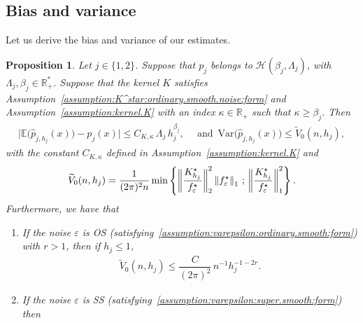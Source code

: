 \documentclass[11pt,a4paper,openany]{article}
\newtheorem{proposition}[thm]{Proposition}
\newcommand{\Var}{\mbox{Var}}
\def\R{\mathbb{R}}
\def\r{{r}}
\begin{document}
\subsection{Bias and variance}
Let us derive the bias and variance of our estimates. 
\begin{proposition}\label{lem:point-wise:mean-var.p1-p2}
	Let $j\in\{1,2\}$. Suppose that $p_{j}$ belongs to  $\mathcal{H}(\beta_{j}, \Lambda_{j})$, with $\Lambda_{j},\beta_{j} \in \R^{*}_{+}$. Suppose that the kernel $K$ satisfies Assumption~\ref{assumption:K^star:ordinary.smooth.noise:form} and  Assumption~\ref{assumption:kernel.K} with an index $\mathcal{\kappa} \in \mathbb{R}_{+}$ such that $\mathcal{\kappa} \geq   \beta_{j}$.  Then 	\begin{align*}
		\Big| \mathbb{E}\big(\widehat{p}_{j , h_{j} }(x)\big) - p_{j}(x) \Big|  
		\leq     C_{K,\mathcal{\kappa}} \,  \Lambda_{j} \,  h_{j}^{\beta_{j}} , 
		\,  &\textrm{ and }  \,
		\Var\big( \widehat{p}_{j , h_{j} }(x) \big)  \leq  
		\widetilde V_{0}(n,h_{j}),
	\end{align*}
	with 	the constant  $C_{K,\mathcal{\kappa}}$ defined in Assumption~\ref{assumption:kernel.K} and 
	\begin{align*}
	\widetilde V_{0}(n,h_{j}) = \frac{1}{(2\pi)^{2} n} \min  \left\{ \left\|  \dfrac{ \hspace{0.01cm}  K_{h_{j}}^{\star} \hspace{0.01cm}   }{f_{\varepsilon}^{\star}}    \right\|_{2}^{2}  \left\| f_{\varepsilon}^{\star} \right\|_{1} \, ; \,  \left\|  \dfrac{ \hspace{0.01cm}  K_{h_{j}}^{\star} \hspace{0.01cm}   }{f_{\varepsilon}^{\star}}    \right\|_{1}^{2}    \right\} \hspace{0.01cm} . 
	\end{align*}
	Furthermore, we have that
\begin{enumerate}	
\item If the noise ${\varepsilon}$ is OS (satisfying~\eqref{assumption:varepsilon:ordinary.smooth:form}) with $r  >  1$, then if $h_j \leq 1$,
	\begin{align*}
		\widetilde V_{0}(n,h_{j})  \leq  \dfrac{    C }{(2\pi)^{2}} \,   n^{-1} h_{j}^{-1 - 2\r}.
	\end{align*}
\item If the noise ${\varepsilon}$ is SS (satisfying~\eqref{assumption:varepsilon:super.smooth:form}) then   	
			\begin{align*}

\end{align*}
\end{enumerate}
\end{proposition}
\end{document}
